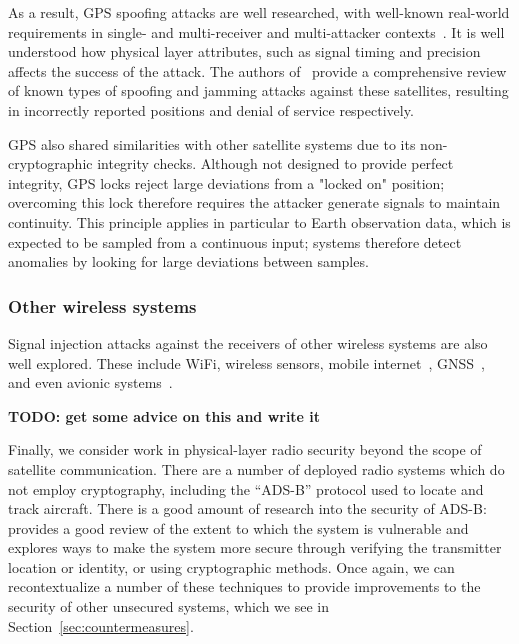 As a result, GPS spoofing attacks are well researched, with well-known real-world requirements in single- and multi-receiver and multi-attacker contexts~\cite{tippenhauer2011requirements}.
It is well understood how physical layer attributes, such as signal timing and precision affects the success of the attack.
The authors of~\cite{wuSpoofing2020} provide a comprehensive review of known types of spoofing and jamming attacks against these satellites, resulting in incorrectly reported positions and denial of service respectively.

GPS also shared similarities with other satellite systems due to its non-cryptographic integrity checks.
Although not designed to provide perfect integrity, GPS locks reject large deviations from a "locked on" position; overcoming this lock therefore requires the attacker generate signals to maintain continuity.
This principle applies in particular to Earth observation data, which is expected to be sampled from a continuous input; systems therefore detect anomalies by looking for large deviations between samples.





\subsubsection{Other wireless systems}

Signal injection attacks against the receivers of other wireless systems are also well explored.
These include WiFi, wireless sensors, mobile internet~\cite{yang2019hiding,erni2021adaptover}, GNSS~\cite{tippenhauer2011requirements}, and even avionic systems~\cite{sathayeWireless2019}.

\textbf{TODO: get some advice on this and write it}

Finally, we consider work in physical-layer radio security beyond the scope of satellite communication.
There are a number of deployed radio systems which do not employ cryptography, including the ``ADS-B'' protocol used to locate and track aircraft.
There is a good amount of research into the security of ADS-B: \cite{strohmeierSecurity2015} provides a good review of the extent to which the system is vulnerable and explores ways to make the system more secure through verifying the transmitter location or identity, or using cryptographic methods.
Once again, we can recontextualize a number of these techniques to provide improvements to the security of other unsecured systems, which we see in Section~\ref{sec:countermeasures}.



